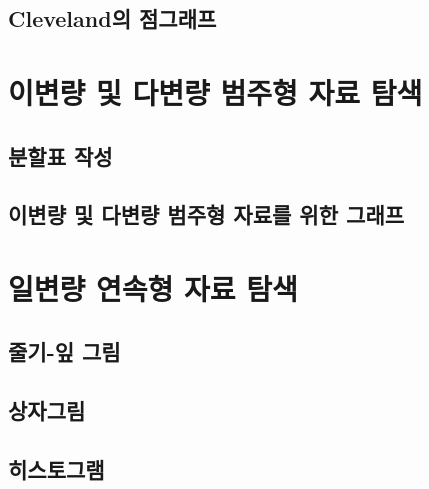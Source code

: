 \documentclass[
]{book}
\begin{document}
\hypertarget{clevelanduxc758-uxc810uxadf8uxb798uxd504}{%
\subsection{Cleveland의 점그래프}\label{clevelanduxc758-uxc810uxadf8uxb798uxd504}}

\hypertarget{uxc774uxbcc0uxb7c9-uxbc0f-uxb2e4uxbcc0uxb7c9-uxbc94uxc8fcuxd615-uxc790uxb8cc-uxd0d0uxc0c9}{%
\section{이변량 및 다변량 범주형 자료 탐색}\label{uxc774uxbcc0uxb7c9-uxbc0f-uxb2e4uxbcc0uxb7c9-uxbc94uxc8fcuxd615-uxc790uxb8cc-uxd0d0uxc0c9}}

\hypertarget{uxbd84uxd560uxd45c-uxc791uxc131}{%
\subsection{분할표 작성}\label{uxbd84uxd560uxd45c-uxc791uxc131}}

\hypertarget{uxc774uxbcc0uxb7c9-uxbc0f-uxb2e4uxbcc0uxb7c9-uxbc94uxc8fcuxd615-uxc790uxb8ccuxb97c-uxc704uxd55c-uxadf8uxb798uxd504}{%
\subsection{이변량 및 다변량 범주형 자료를 위한 그래프}\label{uxc774uxbcc0uxb7c9-uxbc0f-uxb2e4uxbcc0uxb7c9-uxbc94uxc8fcuxd615-uxc790uxb8ccuxb97c-uxc704uxd55c-uxadf8uxb798uxd504}}

\hypertarget{uxc77cuxbcc0uxb7c9-uxc5f0uxc18duxd615-uxc790uxb8cc-uxd0d0uxc0c9}{%
\section{일변량 연속형 자료 탐색}\label{uxc77cuxbcc0uxb7c9-uxc5f0uxc18duxd615-uxc790uxb8cc-uxd0d0uxc0c9}}

\hypertarget{uxc904uxae30-uxc78e-uxadf8uxb9bc}{%
\subsection{줄기-잎 그림}\label{uxc904uxae30-uxc78e-uxadf8uxb9bc}}

\hypertarget{section-boxplot}{%
\subsection{상자그림}\label{section-boxplot}}

\hypertarget{uxd788uxc2a4uxd1a0uxadf8uxb7a8}{%
\subsection{히스토그램}\label{uxd788uxc2a4uxd1a0uxadf8uxb7a8}}
\end{document}

